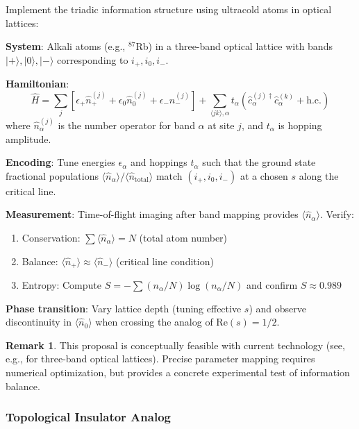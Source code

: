 \documentclass[12pt]{article}
\theoremstyle{plain}
\theoremstyle{definition}
\newtheorem{remark}[theorem]{Remark}
\begin{document}
\begin{proposal}\label{proposal:cold_atoms}
Implement the triadic information structure using ultracold atoms in optical lattices:

\textbf{System}: Alkali atoms (e.g., $^{87}$Rb) in a three-band optical lattice with bands $|+\rangle, |0\rangle, |-\rangle$ corresponding to $i_+, i_0, i_-$.

\textbf{Hamiltonian}:
$$\hat{H} = \sum_{j} \left[\epsilon_+ \hat{n}_+^{(j)} + \epsilon_0 \hat{n}_0^{(j)} + \epsilon_- \hat{n}_-^{(j)}\right] + \sum_{\langle jk \rangle, \alpha} t_\alpha \left(\hat{c}_\alpha^{(j)\dagger} \hat{c}_\alpha^{(k)} + \text{h.c.}\right)$$
where $\hat{n}_\alpha^{(j)}$ is the number operator for band $\alpha$ at site $j$, and $t_\alpha$ is hopping amplitude.

\textbf{Encoding}: Tune energies $\epsilon_\alpha$ and hoppings $t_\alpha$ such that the ground state fractional populations $\langle \hat{n}_\alpha \rangle / \langle \hat{n}_{\text{total}} \rangle$ match $(i_+, i_0, i_-)$ at a chosen $s$ along the critical line.

\textbf{Measurement}: Time-of-flight imaging after band mapping provides $\langle \hat{n}_\alpha \rangle$. Verify:
\begin{enumerate}
\item Conservation: $\sum \langle \hat{n}_\alpha \rangle = N$ (total atom number)
\item Balance: $\langle \hat{n}_+ \rangle \approx \langle \hat{n}_- \rangle$ (critical line condition)
\item Entropy: Compute $S = -\sum (n_\alpha/N) \log(n_\alpha/N)$ and confirm $S \approx 0.989$
\end{enumerate}

\textbf{Phase transition}: Vary lattice depth (tuning effective $s$) and observe discontinuity in $\langle \hat{n}_0 \rangle$ when crossing the analog of $\text{Re}(s) = 1/2$.
\end{proposal}

\begin{remark}
This proposal is conceptually feasible with current technology (see, e.g., \cite{bloch2008} for three-band optical lattices). Precise parameter mapping requires numerical optimization, but provides a concrete experimental test of information balance.
\end{remark}

\subsubsection{Topological Insulator Analog}
\end{document}
